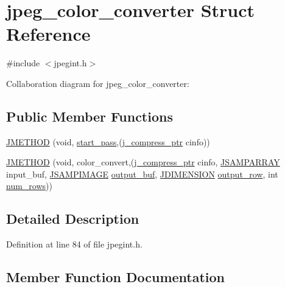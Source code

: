 \hypertarget{structjpeg__color__converter}{}\section{jpeg\+\_\+color\+\_\+converter Struct Reference}
\label{structjpeg__color__converter}


{\ttfamily \#include $<$jpegint.\+h$>$}



Collaboration diagram for jpeg\+\_\+color\+\_\+converter\+:
\subsection*{Public Member Functions}
\begin{DoxyCompactItemize}
\item 
\mbox{\hyperlink{structjpeg__color__converter_a1c9f24e568c3d4f67cb2021066825997}{J\+M\+E\+T\+H\+OD}} (void, \mbox{\hyperlink{jddctmgr_8c_a1964f006adb8fb80f57e455f6452aec1}{start\+\_\+pass}},(\mbox{\hyperlink{jpeglib_8h_add2a072c54e3a51550f4975f7ddb91e7}{j\+\_\+compress\+\_\+ptr}} cinfo))
\item 
\mbox{\hyperlink{structjpeg__color__converter_aed90a059ad823add4785973694ed5eb9}{J\+M\+E\+T\+H\+OD}} (void, color\+\_\+convert,(\mbox{\hyperlink{jpeglib_8h_add2a072c54e3a51550f4975f7ddb91e7}{j\+\_\+compress\+\_\+ptr}} cinfo, \mbox{\hyperlink{jpeglib_8h_ac9d5d1b829ed51769db69a37271a7e91}{J\+S\+A\+M\+P\+A\+R\+R\+AY}} input\+\_\+buf, \mbox{\hyperlink{jpeglib_8h_a4bf858e4d42202287e786bdec2f3b62b}{J\+S\+A\+M\+P\+I\+M\+A\+GE}} \mbox{\hyperlink{jdct_8h_ad7e4660a191b1a791748dd44d5a7a0ec}{output\+\_\+buf}}, \mbox{\hyperlink{jmorecfg_8h_a04ed4674f6f1d0d50ec241531e38274f}{J\+D\+I\+M\+E\+N\+S\+I\+ON}} \mbox{\hyperlink{jpegint_8h_a58518ef80cb2e9d15ba1837bef666ec6}{output\+\_\+row}}, int \mbox{\hyperlink{jpegint_8h_ac5f8b57092da0f421713ba171c4c9f87}{num\+\_\+rows}}))
\end{DoxyCompactItemize}


\subsection{Detailed Description}


Definition at line 84 of file jpegint.\+h.



\subsection{Member Function Documentation}
\mbox{\label{structjpeg__color__converter_a1c9f24e568c3d4f67cb2021066825997}} 
